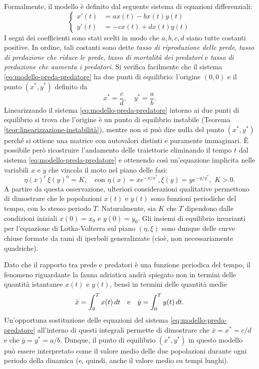 Formalmente, il modello è definito dal seguente sistema di equazioni differenziali:
\begin{equation} \label{eq:modello-preda-predatore}
\left\{
\begin{aligned}
x'(t) &=  ax(t) -bx(t)y(t) \\
y'(t) &= -cx(t) +dx(t)y(t)
\end{aligned}
\right.
\end{equation}
I segni dei coefficienti sono stati scelti in modo che $a,b,c,d$ siano tutte costanti
positive. In ordine, tali costanti sono dette \emph{tasso di riproduzione
delle prede}, \emph{tasso di predazione che riduce le prede}, \emph{tasso di
mortalità dei predatori} e \emph{tasso di predazione che aumenta i predatori}.
Si verifica facilmente che il sistema \eqref{eq:modello-preda-predatore} ha due
punti di equilibrio: l'origine $(0,0)$ e il punto $(x^*,y^*)$ definito da
\[
x^* = \frac{c}{d}, \quad y^* = \frac{a}{b}.
\]
Linearizzando il sistema \eqref{eq:modello-preda-predatore} intorno ai due punti
di equilibrio si trova che l'origine è un punto di equilibrio instabile
(Teorema \ref{teor:linearizzazione-instabilità}),
mentre non si può dire nulla del punto $(x^*,y^*)$
perché si ottiene una matrice con autovalori distinti e puramente immaginari.
È possibile però ricostruire l'andamento delle traiettorie eliminando il
tempo $t$ dal sistema \eqref{eq:modello-preda-predatore} e ottenendo così
un'equazione implicita nelle variabili $x$ e $y$ che vincola il moto
nel piano delle fasi:
\[
\eta(x)^c \, \xi(y)^a = K, \quad \text{con $\eta(x) = xe^{-x/x^*}\!\!$,
$\,\xi(y) = ye^{-y/y^*}\!\!$, $\,K>0$.}
\]
A partire da questa osservazione, ulteriori considerazioni qualitative 
permettono di dimostrare che le popolazioni $x(t)$ e $y(t)$ sono funzioni
periodiche del tempo, con lo stesso periodo $T$. Naturalmente, sia $K$ che $T$
dipendono dalle condizioni iniziali $x(0) = x_0$ e $y(0) = y_0$.
Gli insiemi di equilibrio invarianti per l'equazione di Lotka-Volterra
sul piano $(\eta,\xi)$ sono dunque delle curve chiuse formate da rami
di iperboli generalizzate (cioè, non necessariamente quadriche).

Dato che il rapporto tra prede e predatori è una funzione periodica del tempo,
il fenomeno riguardante la fauna adriatica andrà spiegato non in termini
delle quantità istantanee $x(t)$ e $y(t)$, bensì in termini delle
quantità medie
\[
\bar{x} = \int_0^T x(t) \, dt \quad \text{e} \quad \bar{y} = \int_0^T y(t) \, dt.
\]
Un'opportuna sostituzione delle equazioni del sistema \eqref{eq:modello-preda-predatore}
all'interno di questi integrali permette di dimostrare che
$\bar{x} = x^* = c/d$ e che $\bar{y} = y^* = a/b$.
Dunque, il punto di equilibrio $(x^*,y^*)$ in questo modello può essere
interpretato come il valore medio delle due popolazioni durante ogni periodo
della dinamica (e, quindi, anche il valore medio su tempi lunghi).

